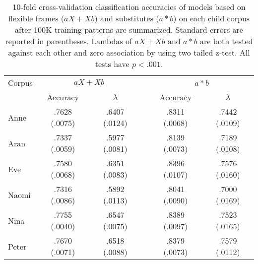 \begin{table}[ht]
  \small
  \centering
  \caption{10-fold cross-validation classification accuracies of models based
    on flexible frames ($aX + Xb$) and substitutes ($a*b$) on each child corpus
    after 100K training patterns are summarized.  Standard errors are reported
    in parentheses.  Lambdas of $aX+Xb$ and $a*b$ are both tested against each
    other and zero association by using two tailed z-test.  All tests have
    $p<.001$.} \begin{tabular}{lccccc}
    \hline
    Corpus & \multicolumn{2}{c}{$aX+Xb$} && \multicolumn{2}{c}{$a*b$} \\
    \cline{2-3}
    \cline{5-6}
    & Accuracy & $\lambda$ && Accuracy & $\lambda$\\
    \hline
    Anne  & .7628 (.0075) & .6407 (.0124) && .8311 (.0068) & .7442 (.0109)\\
    Aran  & .7337 (.0059) & .5977 (.0081) && .8139 (.0073) & .7189 (.0108)\\
    Eve   & .7580 (.0068) & .6351 (.0083) && .8396 (.0107) & .7576 (.0160)\\
    Naomi & .7316 (.0086) & .5892 (.0113) && .8041 (.0090) & .7000 (.0169)\\
    Nina  & .7755 (.0040) & .6547 (.0075) && .8389 (.0097) & .7523 (.0165)\\
    Peter & .7670 (.0071) & .6518 (.0088) && .8379 (.0073) & .7579 (.0112)\\
    \hline
  \end{tabular}
  \label{t:framevssub100K}
\end{table}

